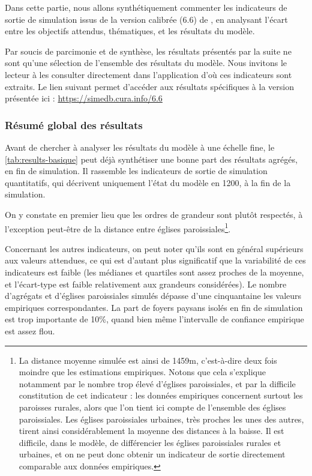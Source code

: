 Dans cette partie, nous allons synthétiquement commenter les indicateurs de sortie de simulation issus de la version calibrée (6.6) de \simfeodal{}, en analysant l'écart entre les objectifs attendus, thématiques, et les résultats du modèle.

\begin{mdframed}[backgroundcolor=black!5,footnoteinside=false]
Par soucis de parcimonie et de synthèse, les résultats présentés par la suite ne sont qu'une sélection de l'ensemble des résultats du modèle.
Nous invitons le lecteur à les consulter directement dans l'application \simedb{} d'où ces indicateurs sont extraits.
Le lien suivant permet d'accéder aux résultats spécifiques à la version présentée ici : \href{https://simedb.cura.info/6.6}{https://simedb.cura.info/6.6}
\end{mdframed}

\subsubsection{Résumé global des résultats \label{ssec:results-global}}

Avant de chercher à analyser les résultats du modèle à une échelle fine, le \cref{tab:results-basique} peut déjà synthétiser une bonne part des résultats agrégés, en fin de simulation.
Il rassemble les indicateurs de sortie de simulation quantitatifs, qui décrivent uniquement l'état du modèle en 1200, à la fin de la simulation.




On y constate en premier lieu que les ordres de grandeur sont plutôt respectés, à l'exception peut-être de la distance entre églises paroissiales\footnote{
	La distance moyenne simulée	est ainsi de 1459m, c'est-à-dire deux fois moindre que les estimations empiriques.
	Notons que cela s'explique notamment par le nombre trop élevé d'églises paroissiales, et par la difficile constitution de cet indicateur : les données empiriques concernent surtout les paroisses rurales, alors que l'on tient ici compte de l'ensemble des églises paroissiales.
	Les églises paroissiales urbaines, très proches les unes des autres, tirent ainsi considérablement la moyenne des distances à la baisse.
	Il est difficile, dans le modèle, de différencier les églises paroissiales rurales et urbaines, et on ne peut donc obtenir un indicateur de sortie directement comparable aux données empiriques.
}.

Concernant les autres indicateurs, on peut noter qu'ils sont en général supérieurs aux valeurs attendues, ce qui est d'autant plus significatif que la variabilité de ces indicateurs est faible (les médianes et quartiles sont assez proches de la moyenne, et l'écart-type est faible relativement aux grandeurs considérées).
Le nombre d'agrégats et d'églises paroissiales simulés dépasse d'une cinquantaine les valeurs empiriques correspondantes.
La part de foyers paysans isolés en fin de simulation est trop importante de 10\%, quand bien même l'intervalle de confiance empirique est assez flou.

